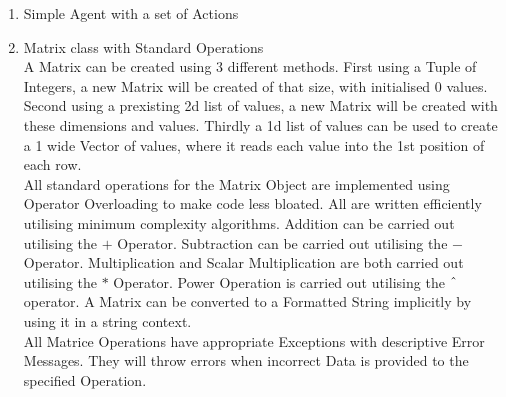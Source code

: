 \begin{flushleft}
\begin{enumerate}
\begin{enumerate}
                    \vspace{0.5cm}   
                \item Simple Agent with a set of Actions \\
                    \vspace{0.2cm}
                    

                    \vspace{0.5cm}   
                \item Matrix class with Standard Operations \\
                    \vspace{0.2cm}
                    A Matrix can be created using 3 different methods. First using a Tuple of Integers, a new Matrix will be created of that size, with initialised
                    0 values. Second using a prexisting 2d list of values, a new Matrix will be created with these dimensions and values. Thirdly a 1d list of
                    values can be used to create a 1 wide Vector of values, where it reads each value into the 1st position of each row. \\
                    \vspace{0.2cm}
                    All standard operations for the Matrix Object are implemented using Operator Overloading to make code less bloated. All are written 
                    efficiently utilising minimum complexity algorithms. Addition can be carried out utilising the $+$ Operator. Subtraction can be carried out
                    utilising the $-$ Operator. Multiplication and Scalar Multiplication are both carried out utilising the $*$ Operator. Power Operation is
                    carried out utilising the $\string^$ operator. A Matrix can be converted to a Formatted String implicitly by using it in a string context. \\
                    \vspace{0.2cm}
                    All Matrice Operations have appropriate Exceptions with descriptive Error Messages. They will throw errors when incorrect Data is provided to
                    the specified Operation. \\


\end{enumerate}
\end{enumerate}
\end{flushleft}
